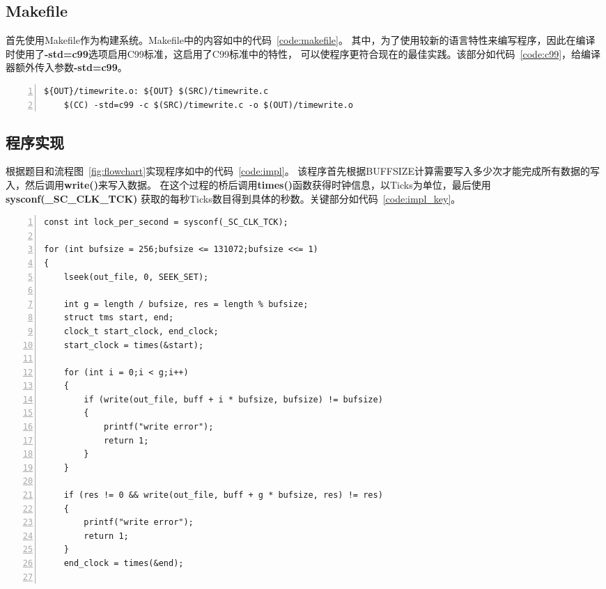 \documentclass[a4paper,twoside]{article}
\begin{document}
\begin{spacing}{1.2}
\begin{figure}[htbp]
\begin{tikzpicture}[node distance=1cm]
	\end{tikzpicture}
\end{figure}

\subsection{Makefile}

首先使用Makefile作为构建系统。Makefile中的内容如中的代码~\ref{code:makefile}。
其中，为了使用较新的语言特性来编写程序，因此在编译时使用了\textbf{-std=c99}选项启用C99标准，这启用了C99标准中的特性，
可以使程序更符合现在的最佳实践。该部分如代码~\ref{code:c99}，给编译器额外传入参数\textbf{-std=c99}。

\begin{lstlisting}[numbers=left,style=MakefileStyle,caption=Makefile,label={code:c99}]
${OUT}/timewrite.o: ${OUT} $(SRC)/timewrite.c
	$(CC) -std=c99 -c $(SRC)/timewrite.c -o $(OUT)/timewrite.o
\end{lstlisting}

\subsection{程序实现}

根据题目和流程图~\ref{fig:flowchart}实现程序如中的代码~\ref{code:impl}。
该程序首先根据BUFFSIZE计算需要写入多少次才能完成所有数据的写入，然后调用\textbf{write()}来写入数据。
在这个过程的桥后调用\textbf{times()}函数获得时钟信息，以Ticks为单位，最后使用\textbf{sysconf(\_SC\_CLK\_TCK)}
获取的每秒Ticks数目得到具体的秒数。关键部分如代码~\ref{code:impl_key}。


\begin{lstlisting}[numbers=left,style=CppStyle,caption=程序关键部分,label={code:impl_key}]
const int lock_per_second = sysconf(_SC_CLK_TCK);

for (int bufsize = 256;bufsize <= 131072;bufsize <<= 1)
{
    lseek(out_file, 0, SEEK_SET);

    int g = length / bufsize, res = length % bufsize;
    struct tms start, end;
    clock_t start_clock, end_clock;
    start_clock = times(&start);
    
    for (int i = 0;i < g;i++)
    {
        if (write(out_file, buff + i * bufsize, bufsize) != bufsize)
        {
            printf("write error");
            return 1;
        }
    }

    if (res != 0 && write(out_file, buff + g * bufsize, res) != res)
    {
        printf("write error");
        return 1;
    }
    end_clock = times(&end);


\end{lstlisting}
\end{spacing}
\end{document}
